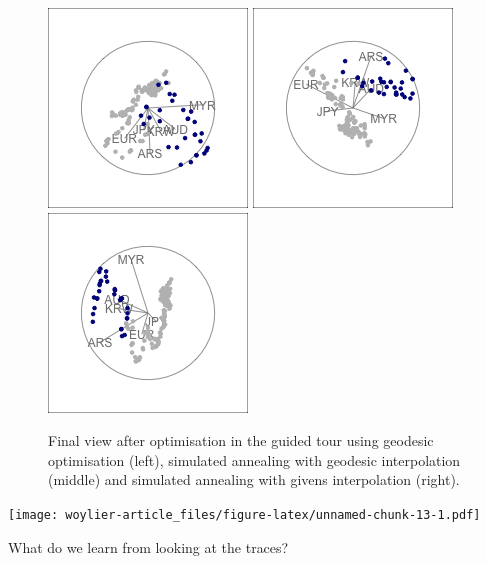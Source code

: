 \begin{figure}

{\centering \includegraphics[width=0.3\linewidth]{rates_tour_geodesic_final} \includegraphics[width=0.3\linewidth]{rates_tour_better_final} \includegraphics[width=0.3\linewidth]{rates_tour_givens_final} 

}

\caption{Final view after optimisation in the guided tour using geodesic optimisation (left), simulated annealing with geodesic interpolation (middle) and simulated annealing with givens interpolation (right).}\label{fig:rates-tour-static}
\end{figure}

\texttt{[image: woylier-article\_files/figure-latex/unnamed-chunk-13-1.pdf]}

What do we learn from looking at the traces?


